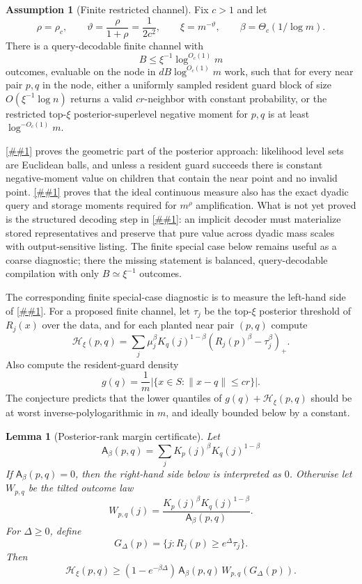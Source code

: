 \documentclass[10pt]{article}
\newcommand{\cref}[1]{\ref{##1}}
\newcommand{\Cref}[1]{\ref{##1}}
\newtheorem{lemma}[theorem]{Lemma}
\theoremstyle{definition}
\newtheorem{assumption}[theorem]{Assumption}
\begin{document}
\begin{assumption}[Finite restricted channel]\label{asm:finite-restricted-channel}
   Fix $c>1$ and let
   \[
      \rho=\rho_c,
      \qquad
      \vartheta=\frac{\rho}{1+\rho}=\frac1{2c^2},
      \qquad
      \xi=m^{-\vartheta},
      \qquad
      \beta=\Theta_c(1/\log m).
   \]
   There is a query-decodable finite channel with
   \[
      B\le\xi^{-1}\log^{O_c(1)}m
   \]
   outcomes, evaluable on the node in $dB\log^{O_c(1)}m$ work, such that for every near pair $p,q$ in the node, either a uniformly sampled resident guard block of size $O(\xi^{-1}\log n)$ returns a valid $cr$-neighbor with constant probability, or the restricted top-$\xi$ posterior-superlevel negative moment for $p,q$ is at least $\log^{-O_c(1)}m$.
\end{assumption}

\Cref{thm:continuous-likelihood-balls} proves the geometric part of the posterior approach: likelihood level sets are Euclidean balls, and unless a resident guard succeeds there is constant negative-moment value on children that contain the near point and no invalid point. \Cref{lem:ideal-likelihood-scale-profile} proves that the ideal continuous measure also has the exact dyadic query and storage moments required for $m^\rho$ amplification. What is not yet proved is the structured decoding step in \cref{asm:multiscale-structured-likelihood}: an implicit decoder must materialize stored representatives and preserve that pure value across dyadic mass scales with output-sensitive listing. The finite special case below remains useful as a coarse diagnostic; there the missing statement is balanced, query-decodable compilation with only $B\simeq\xi^{-1}$ outcomes.

The corresponding finite special-case diagnostic is to measure the left-hand side of \cref{asm:finite-restricted-channel}. For a proposed finite channel, let $\tau_j$ be the top-$\xi$ posterior threshold of $R_j(x)$ over the data, and for each planted near pair $(p,q)$ compute
\[
   \mathcal H_\xi(p,q)
   =
   \sum_j
   \mu_j^\beta K_q(j)^{1-\beta}
   \left(R_j(p)^\beta-\tau_j^\beta\right)_+ .
\]
Also compute the resident-guard density
\[
   g(q)=\frac1m|\{x\in S:\|x-q\|\le cr\}|.
\]
The conjecture predicts that the lower quantiles of $g(q)+\mathcal H_\xi(p,q)$ should be at worst inverse-polylogarithmic in $m$, and ideally bounded below by a constant.

\begin{lemma}[Posterior-rank margin certificate]\label{lem:posterior-rank-margin}
   Let
   \[
      \mathsf A_\beta(p,q)=\sum_j K_p(j)^\beta K_q(j)^{1-\beta}
   \]
   If $\mathsf A_\beta(p,q)=0$, then the right-hand side below is interpreted as $0$. Otherwise let $W_{p,q}$ be the tilted outcome law
   \[
      W_{p,q}(j)=\frac{K_p(j)^\beta K_q(j)^{1-\beta}}{\mathsf A_\beta(p,q)}.
   \]
   For $\Delta\ge0$, define
   \[
      G_\Delta(p)=\{j:R_j(p)\ge e^\Delta\tau_j\}.
   \]
   Then
   \[
      \mathcal H_\xi(p,q)
      \ge
      (1-e^{-\beta\Delta})\,
      \mathsf A_\beta(p,q)\,
      W_{p,q}(G_\Delta(p)).
   \]
\end{lemma}
\end{document}

